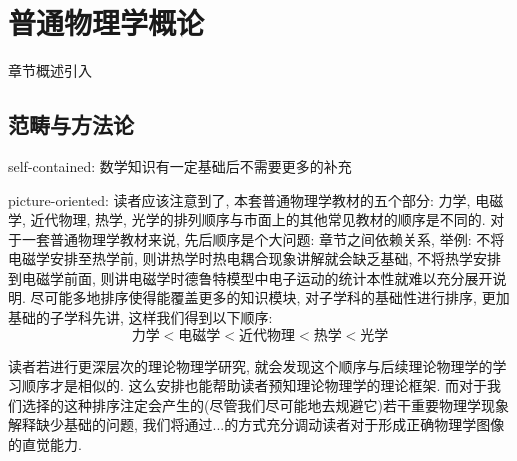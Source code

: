 \chapter{普通物理学概论}\label{1}

章节概述引入

\section{范畴与方法论}\label{1-1}

self-contained: 数学知识有一定基础后不需要更多的补充

picture-oriented: 读者应该注意到了, 本套普通物理学教材的五个部分: 力学, 电磁学, 近代物理, 热学, 光学的排列顺序与市面上的其他常见教材的顺序是不同的. 对于一套普通物理学教材来说, 先后顺序是个大问题: 章节之间依赖关系, 举例: 不将电磁学安排至热学前, 则讲热学时热电耦合现象讲解就会缺乏基础, 不将热学安排到电磁学前面, 则讲电磁学时德鲁特模型中电子运动的统计本性就难以充分展开说明. 尽可能多地排序使得能覆盖更多的知识模块, 对子学科的基础性进行排序, 更加基础的子学科先讲, 这样我们得到以下顺序:
\[\text{力学}<\text{电磁学}<\text{近代物理}<\text{热学}<\text{光学}\]

读者若进行更深层次的理论物理学研究, 就会发现这个顺序与后续理论物理学的学习顺序才是相似的. 这么安排也能帮助读者预知理论物理学的理论框架. 而对于我们选择的这种排序注定会产生的(尽管我们尽可能地去规避它)若干重要物理学现象解释缺少基础的问题, 我们将通过...的方式充分调动读者对于形成正确物理学图像的直觉能力.